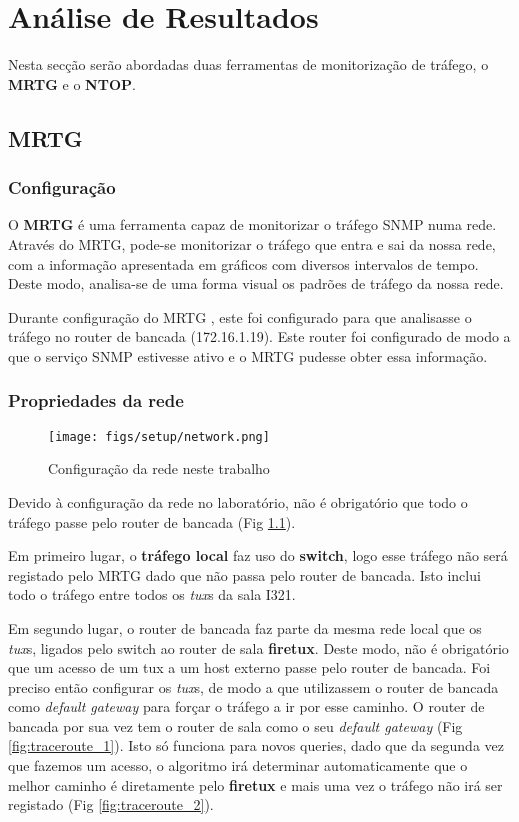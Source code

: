 \chapter{Análise de Resultados}

Nesta secção serão abordadas duas ferramentas de monitorização de tráfego, o \textbf{MRTG} e o \textbf{NTOP}.

\section{MRTG}

\subsection{Configuração}

O \textbf{MRTG} é uma ferramenta capaz de monitorizar o tráfego SNMP numa rede.
Através do MRTG, pode-se monitorizar o tráfego que entra e sai da nossa rede, com a informação apresentada em gráficos com diversos intervalos de tempo.
Deste modo, analisa-se de uma forma visual os padrões de tráfego da nossa rede.

Durante configuração do MRTG \cite{mrtg}, este foi configurado para que analisasse o tráfego no router de bancada (172.16.1.19).
Este router foi configurado de modo a que o serviço SNMP estivesse ativo e o MRTG pudesse obter essa informação.

\subsection{Propriedades da rede} \label{prop_rede}

\begin{figure}
    \centering
    \texttt{[image: figs/setup/network.png]}
    \caption{Configuração da rede neste trabalho}
    \label{fig:network}
\end{figure}

Devido à configuração da rede no laboratório, não é obrigatório que todo o tráfego passe pelo router de bancada (Fig \ref{fig:network}).

Em primeiro lugar, o \textbf{tráfego local} faz uso do \textbf{switch}, logo esse tráfego não será registado pelo MRTG dado que não passa pelo router de bancada.
Isto inclui todo o tráfego entre todos os \textit{tux}s da sala I321.

Em segundo lugar, o router de bancada faz parte da mesma rede local que os \textit{tux}s, ligados pelo switch ao router de sala \textbf{firetux}.
Deste modo, não é obrigatório que um acesso de um tux a um host externo passe pelo router de bancada.
Foi preciso então configurar os \textit{tux}s, de modo a que utilizassem o router de bancada como \textit{default gateway} para forçar o tráfego a ir por esse caminho.
O router de bancada por sua vez tem o router de sala como o seu \textit{default gateway} (Fig \ref{fig:traceroute_1}).
Isto só funciona para novos queries, dado que da segunda vez que fazemos um acesso, o algoritmo irá determinar automaticamente que o melhor caminho é diretamente pelo \textbf{firetux} e mais uma vez o tráfego não irá ser registado (Fig \ref{fig:traceroute_2}).

